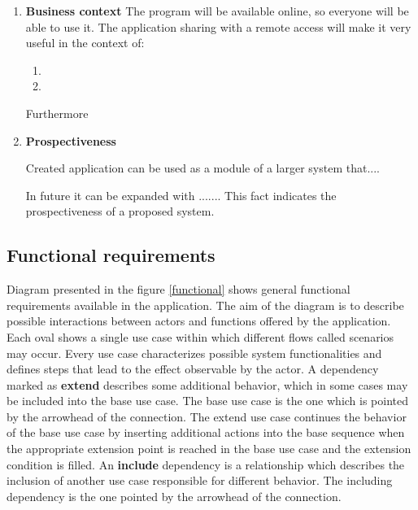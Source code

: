 \begin{enumerate}

\item \textbf{Business context} The program will be available online, so everyone will be able to use it. The application sharing with a remote access will make it very useful in the context of:

\begin{enumerate}

\item 

\item 

\end{enumerate}

Furthermore 

\item \textbf{Prospectiveness}

Created application can be used as a module of a larger system that.... 

In future it can be expanded with ....... This fact indicates the prospectiveness of a proposed system. 

\end{enumerate}

\subsection{Functional requirements}


Diagram presented in the figure \ref{functional} shows general functional requirements available in the application. The aim of the diagram is to describe possible interactions between actors and functions offered by the application. Each oval shows a single use case within which different flows called scenarios may occur. Every use case characterizes possible system functionalities and defines steps that lead to the effect observable by the actor. A dependency marked as \textbf{extend} describes some additional behavior, which in some cases may be included into the base use case. 
The base use case is the one which is pointed by the arrowhead of the connection. The extend use case continues the behavior of the base use case by inserting additional actions into the base sequence when the appropriate extension point is reached in the base use case and the extension condition is filled. An \textbf{include} dependency is a relationship which describes the inclusion of another use case responsible for different behavior. The including dependency is the one pointed by the arrowhead of the connection.

